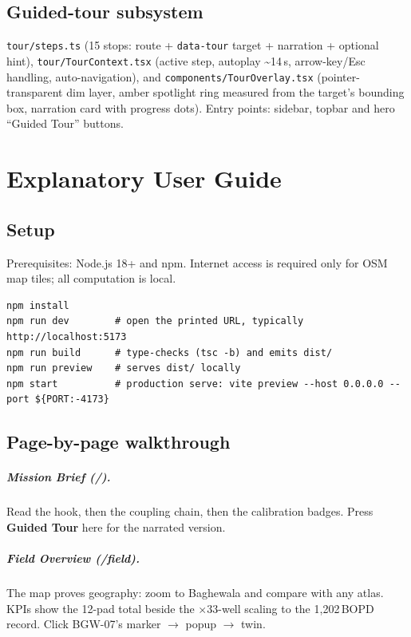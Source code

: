 \documentclass[12pt,a4paper]{report}
\begin{document}
\section{Guided-tour subsystem}
\texttt{tour/steps.ts} (15 stops: route + \texttt{data-tour} target + narration
+ optional hint), \texttt{tour/TourContext.tsx} (active step, autoplay
\textasciitilde14\,s, arrow-key/Esc handling, auto-navigation), and
\texttt{components/TourOverlay.tsx} (pointer-transparent dim layer, amber
spotlight ring measured from the target's bounding box, narration card with
progress dots). Entry points: sidebar, topbar and hero ``Guided Tour'' buttons.

\chapter{Explanatory User Guide}
\section{Setup}
Prerequisites: Node.js 18+ and npm. Internet access is required only for OSM
map tiles; all computation is local.
\begin{lstlisting}
npm install
npm run dev        # open the printed URL, typically http://localhost:5173
npm run build      # type-checks (tsc -b) and emits dist/
npm run preview    # serves dist/ locally
npm start          # production serve: vite preview --host 0.0.0.0 --port ${PORT:-4173}
\end{lstlisting}

\section{Page-by-page walkthrough}
\paragraph{Mission Brief (/).} Read the hook, then the coupling chain, then the
calibration badges. Press \textbf{Guided Tour} here for the narrated version.

\paragraph{Field Overview (/field).} The map proves geography: zoom to
Baghewala and compare with any atlas. KPIs show the 12-pad total beside the
$\times33$-well scaling to the 1,202\,BOPD record. Click BGW-07's marker
$\rightarrow$ popup $\rightarrow$ twin.
\end{document}
